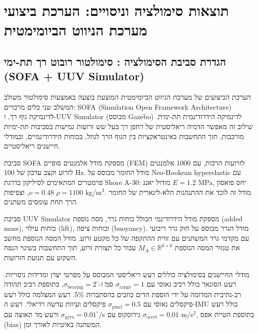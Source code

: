 

\section{תוצאות סימולציה וניסויים: הערכת ביצועי מערכת הניווט הביומימטית}
\label{sec:ch08_results}

\subsection{הגדרת סביבת הסימולציה : סימולטור רובוט רך תת-ימי (SOFA + UUV Simulator)}
\label{sec:ch08_simulation_setup}

הערכת הביצועים של מערכת הניווט הביומימטית המוצעת בוצעה באמצעות סימולטור משולב המשלב שני כלים מרכזיים: SOFA (Simulation Open Framework Architecture) לדינמיקת גוף רך, ו-UUV Simulator (מבוסס Gazebo) לדינמיקה הידרודינמית תת-ימית. שילוב זה מאפשר הדמיה ריאליסטית של רחפן רך בעל שש זרועות גמישות בסביבות תת-ימיות מורכבות, תוך התחשבות באינטראקציות בין הגוף הרך לנוזל, בכוחות הידרודינמיים, ובמודלי חיישנים ריאליסטיים.

סביבת SOFA מספקת מודל אלמנטים סופיים (FEM) לזרועות הרכות, עם 1000 אלמנטים לזרוע וקצב עדכון של 100 Hz. מודל החומר מבוסס על Neo-Hookean hyperelastic עם פרמטרים המתאימים לסיליקון בדרגת Shore A-30: מודול יאנג $E = 1.2$ MPa, יחס פואסון $\nu = 0.48$, וצפיפות $\rho = 1100$ kg/m$^3$. מודל זה לוכד את ההתנהגות הלא-לינארית של החומר הרך תחת עומסים משתנים.

סביבת UUV Simulator מספקת מודל הידרודינמי הכולל כוחות גרר, מסה נוספת (added mass), כוחות עילוי (lift), וכוחות ציפה (buoyancy). מודל הגרר מבוסס על חוק גרר ריבועי עם מקדמי גרר המשתנים עם זווית ההתקפה של כל מקטע זרוע. מודל המסה הנוספת מחשב את טנזור המסה הנוספת $M_A \in \mathbb{R}^{6 \times 6}$ עבור כל תצורת זרוע, תוך התחשבות בשינוי הנפח השקוע עם תנועת הזרועות.

מודלי החיישנים בסימולציה כוללים רעש ריאליסטי המבוסס על מפרטי יצרן ומדידות ניסוייות. רעש הסונאר כולל רכיב גאוסי עם $\sigma_{\text{range}} = 1$ ס\"מ ו-$\sigma_{\text{bearing}} = 2^\circ$, בתוספת רכיב תהודה רב-נתיבית המדומה על ידי הוספת הדים כוזבים בהסתברות 5\%. רעש המצלמה כולל רעש פיקסלים גאוסי עם $\sigma_{\text{pixel}} = 0.5$ פיקסלים ועיוות עדשה רדיאלי. רעש ה-IMU כולל רעש גירוסקופ עם $\sigma_{\text{gyro}} = 0.01^\circ/\text{s}$ ורעש מד תאוצה עם $\sigma_{\text{accel}} = 0.01$ m/s$^2$, בתוספת הטיית אפס (bias) המשתנה באיטיות לאורך זמן.

